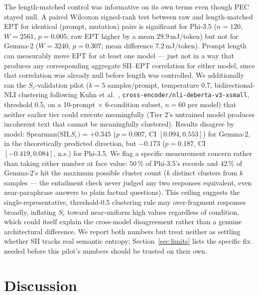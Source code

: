 \documentclass[conference]{IEEEtran}
\begin{document}
The length-matched control was informative on its own terms even
though PEC stayed null. A paired Wilcoxon signed-rank test between raw
and length-matched EPT for identical (prompt, mutation) pairs is
significant for Phi-3.5 ($n=120$, $W=2561$, $p=0.005$; raw EPT higher
by a mean $29.9$\,mJ/token) but not for Gemma-2 ($W=3240$, $p=0.307$;
mean difference $7.2$\,mJ/token). Prompt length can measurably move
EPT for at least one model --- just not in a way that produces any
corresponding aggregate SII--EPT correlation for either model, since
that correlation was already null before length was controlled.
We additionally ran the $S_c$-validation pilot ($k=5$ samples/prompt,
temperature 0.7, bidirectional-NLI clustering following Kuhn et
al.~\cite{kuhn2023semantic}, \texttt{cross-encoder/nli-deberta-v3-xsmall},
threshold 0.5, on a 10-prompt $\times$ 6-condition subset, $n=60$ per
model) that neither earlier tier could execute meaningfully (Tier 2's
untrained model produces incoherent text that cannot be meaningfully
clustered). Results disagree by model: Spearman(SII,$S_c)=+0.345$
($p=0.007$, CI $[0.094,0.553]$) for Gemma-2, in the theoretically
predicted direction, but $-0.173$ ($p=0.187$, CI $[-0.419,0.084]$,
n.s.) for Phi-3.5. We flag a specific measurement concern rather than
taking either number at face value: $50\,\%$ of Phi-3.5's records and
$42\,\%$ of Gemma-2's hit the maximum possible cluster count ($k$
distinct clusters from $k$ samples --- the entailment check never
judged any two responses equivalent, even near-paraphrase answers to
plain factual questions). This ceiling suggests the single-representative,
threshold-0.5 clustering rule may over-fragment responses broadly,
inflating $S_c$ toward near-uniform high values regardless of
condition, which could itself explain the cross-model disagreement
rather than a genuine architectural difference. We report both
numbers but treat neither as settling whether SII tracks real semantic
entropy; Section~\ref{sec:limits} lists the specific fix needed before
this pilot's numbers should be trusted on their own.
\section{Discussion}
\label{sec:discussion}
\end{document}
